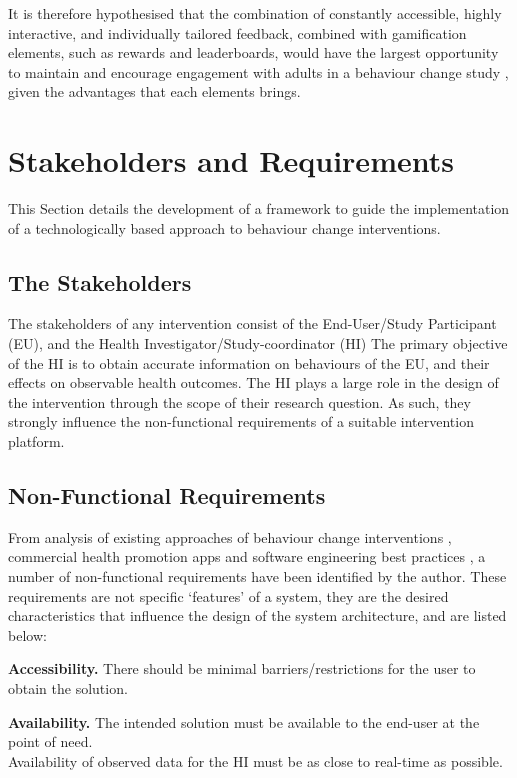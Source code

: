 It is therefore hypothesised that the combination of constantly accessible, highly interactive, and individually tailored feedback, combined with gamification elements, such as rewards and leaderboards, would have the largest opportunity to maintain and encourage engagement with adults in a behaviour change study \cite{Middelweerd2014}, given the advantages that each elements brings.
\section{Stakeholders and Requirements}
This Section details the development of a framework to guide the implementation of a technologically based approach to behaviour change interventions.

\subsection{The Stakeholders}
The stakeholders of any intervention consist of the End-User/Study Participant (EU), and the Health Investigator/Study-coordinator (HI)
The primary objective of the HI is to obtain accurate information on behaviours of the EU, and their effects on observable health outcomes. The HI plays a large role in the design of the intervention through the scope of their research question. As such, they strongly influence the non-functional requirements of a suitable intervention platform.

\subsection{Non-Functional Requirements}
From analysis of existing approaches of behaviour change interventions \cite{Prochaska2005,Ruiter2014}, commercial health promotion apps \cite{Ozdalga2012, Higgins2016} and software engineering best practices \cite{Fielding2000, Jones2010}, a number of non-functional requirements have been identified by the author. These requirements are not specific `features' of a system, they are the desired characteristics that influence the design of the system architecture, and are listed below:

\textbf{Accessibility.}
There should be minimal barriers/restrictions for the user to obtain the solution.

\textbf{Availability.}
The intended solution must be available to the end-user at the point of need.
\\Availability of observed data for the HI must be as close to real-time as possible.

